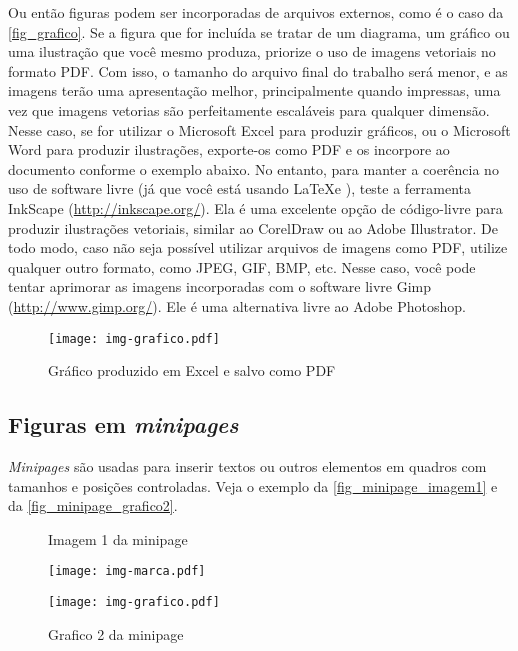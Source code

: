 Ou então figuras podem ser incorporadas de arquivos externos, como é o caso da \autoref{fig_grafico}. Se a figura que for incluída se tratar de um diagrama, um gráfico ou uma ilustração que você mesmo produza, priorize o uso de imagens vetoriais no formato PDF. Com isso, o tamanho do arquivo final do trabalho será menor, e as imagens terão uma apresentação melhor, principalmente quando impressas, uma vez que imagens vetorias são perfeitamente escaláveis para qualquer dimensão. Nesse caso, se for utilizar o Microsoft Excel para produzir gráficos, ou o Microsoft Word para produzir ilustrações, exporte-os como PDF e os incorpore ao documento conforme o exemplo abaixo. No entanto, para manter a coerência no uso de software livre (já que você está usando \LaTeX e \abnTeX), teste a ferramenta \textsf{InkScape} (\url{http://inkscape.org/}). Ela é uma excelente opção de código-livre para produzir ilustrações vetoriais, similar ao CorelDraw ou ao Adobe Illustrator. De todo modo, caso não seja possível utilizar arquivos de imagens como PDF, utilize qualquer outro formato, como JPEG, GIF, BMP, etc. Nesse caso, você pode tentar aprimorar as imagens incorporadas com o software livre \textsf{Gimp} (\url{http://www.gimp.org/}). Ele é uma alternativa livre ao Adobe Photoshop.


\begin{figure}[htb]
   \caption{\label{fig_grafico}Gráfico produzido em Excel e salvo como PDF}
   \begin{center}
      \texttt{[image: img-grafico.pdf]}
   \end{center}
\end{figure}

\subsection{Figuras em \emph{minipages}}

\emph{Minipages} são usadas para inserir textos ou outros elementos em quadros com tamanhos e posições controladas. Veja o exemplo da \autoref{fig_minipage_imagem1} e da \autoref{fig_minipage_grafico2}.

\begin{figure}[htb]
   \label{teste}
   \centering
   \begin{minipage}{0.4\textwidth}
      \centering
      \caption{Imagem 1 da minipage} \label{fig_minipage_imagem1}
      \texttt{[image: img-marca.pdf]}
   \end{minipage}
   \hfill
   \begin{minipage}{0.4\textwidth}
      \centering
      \caption{Grafico 2 da minipage} \label{fig_minipage_grafico2}
      \texttt{[image: img-grafico.pdf]}
   \end{minipage}
\end{figure}

